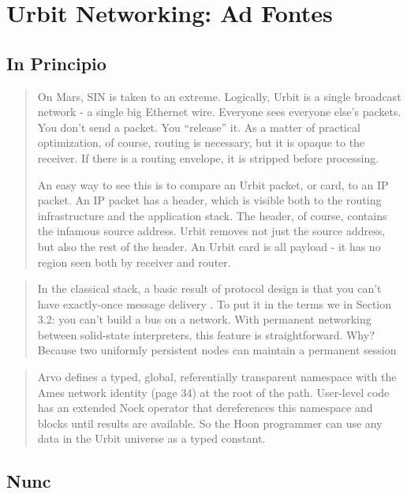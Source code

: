 \section{Urbit Networking: Ad Fontes}

\subsection{In Principio}

\begin{quote}
On Mars, SIN is taken to an extreme. Logically, Urbit is a single
broadcast network - a single big Ethernet wire. Everyone sees everyone
else's packets. You don't send a packet. You ``release'' it. As a matter
of practical optimization, of course, routing is necessary, but it is
opaque to the receiver. If there is a routing envelope, it is stripped
before processing.

An easy way to see this is to compare an Urbit packet, or card, to an IP
packet. An IP packet has a header, which is visible both to the routing
infrastructure and the application stack. The header, of course,
contains the infamous source address. Urbit removes not just the source
address, but also the rest of the header. An Urbit card is all payload -
it has no region seen both by receiver and router.
\end{quote}

\cite{Yarvin2010}

\begin{quote}
In the classical stack, a basic result of protocol design is that you
can't have exactly-once message delivery . To put it in the terms we in
Section 3.2: you can't build a bus on a network. With permanent
networking between solid-state interpreters, this feature is
straightforward. Why? Because two uniformly persistent nodes can
maintain a permanent session
\end{quote}

\begin{quote}
Arvo defines a typed, global, referentially transparent namespace with
the Ames network identity (page 34) at the root of the path. User-level
code has an extended Nock operator that dereferences this namespace and
blocks until results are available. So the Hoon programmer can use any
data in the Urbit universe as a typed constant.
\end{quote}

\cite{Whitepaper}

\subsection{Nunc}

